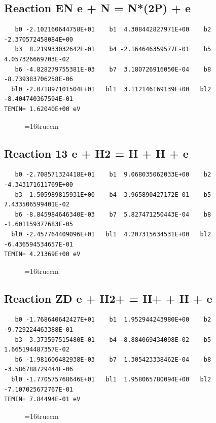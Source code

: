 \documentclass[12pt,dvipdfm]{article}
\begin{document}
\subsection{
Reaction EN e + N = N*(2P) + e}
\begin{small}\begin{verbatim}
   b0 -2.102160644758E+01    b1  4.308442827971E+00    b2 -2.370572458084E+00
   b3  8.219933032642E-01    b4 -2.164646359577E-01    b5  4.057326669703E-02
   b6 -4.828279755381E-03    b7  3.180726916050E-04    b8 -8.739383706258E-06
  bl0 -2.071897101504E+01   bl1  3.112146169139E+00   bl2 -8.404740367594E-01
TEMIN= 1.62040E+00 eV
   \end{verbatim}\end{small}
\begin{figure}[h!]
\label{n2rates}
\epsfxsize=16truecm
\end{figure}
\newpage

\subsection{
Reaction 13 e + H2 = H + H + e}
\begin{small}\begin{verbatim}
   b0 -2.708571324418E+01    b1  9.068035062033E+00    b2 -4.343171611769E+00
   b3  1.505989815931E+00    b4 -3.965890427172E-01    b5  7.433506599401E-02
   b6 -8.845984646340E-03    b7  5.827471250443E-04    b8 -1.601159377683E-05
  bl0 -2.457764409096E+01   bl1  4.207315634531E+00   bl2 -6.436594534657E-01
TEMIN= 4.21369E+00 eV
   \end{verbatim}\end{small}
\begin{figure}[h!]
\label{n2rates}
\epsfxsize=16truecm
\end{figure}
\newpage

\subsection{
Reaction ZD e + H2+ = H+ + H  + e}
\begin{small}\begin{verbatim}
   b0 -1.768640642427E+01    b1  1.952944243980E+00    b2 -9.729224463388E-01
   b3  3.373597515480E-01    b4 -8.884069434098E-02    b5  1.665194487357E-02
   b6 -1.981606482938E-03    b7  1.305423338462E-04    b8 -3.586788729444E-06
  bl0 -1.770575768646E+01   bl1  1.958065780094E+00   bl2 -7.107025672767E-01
TEMIN= 7.84494E-01 eV
   \end{verbatim}\end{small}
\begin{figure}[h!]
\label{n2rates}
\epsfxsize=16truecm
\end{figure}
\newpage
\end{document}
